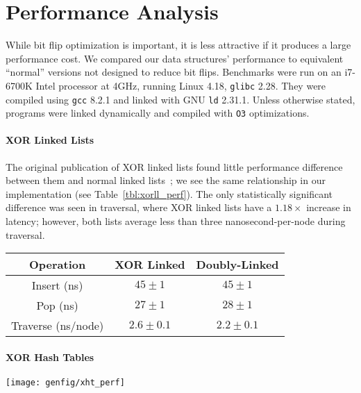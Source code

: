 \section{Performance Analysis}
\label{sec:perf}

While bit flip optimization is important, it is less attractive if it produces a
large performance cost. We compared our data structures' performance to equivalent ``normal''
versions not designed to reduce bit flips.
Benchmarks were run on an i7-6700K Intel processor at 4GHz, running Linux 4.18, \texttt{glibc} 2.28.
They were compiled using \texttt{gcc} 8.2.1 and linked with GNU \texttt{ld} 2.31.1. Unless
otherwise stated, programs were linked dynamically and compiled with \texttt{O3}
optimizations.

\paragraph{XOR Linked Lists}

The original publication of XOR linked lists found little performance difference
between them and normal linked lists~\cite{xorll}; we see the same relationship
in our implementation (see Table~\ref{tbl:xorll_perf}). The only statistically
significant difference was seen in traversal, where XOR linked lists have a
$1.18\times$ increase in latency; however, both lists average less than three
nanosecond-per-node during traversal.

\begin{SCtable}
	\centering
	\caption[XOR and standard linked list performance]{Performance of XOR linked lists compared with doubly-linked lists.}
	\label{tbl:xorll_perf}
	\begin{tabular}{c|c c}
		Operation          & XOR Linked    & Doubly-Linked \\
		\hline
		Insert (ns)        & $45 \pm 1$    & $45 \pm 1$    \\
		Pop (ns)           & $27 \pm 1$    & $28 \pm 1$    \\
		Traverse (ns/node) & $2.6 \pm 0.1$ & $2.2 \pm 0.1$ \\
	\end{tabular}
\end{SCtable}

\paragraph{XOR Hash Tables}



\begin{SCfigure}
	\centering
	\texttt{[image: genfig/xht\_perf]}
	\caption{Performance of XOR hash table variants.}
	\label{fig:xht_perf}
\end{SCfigure}

